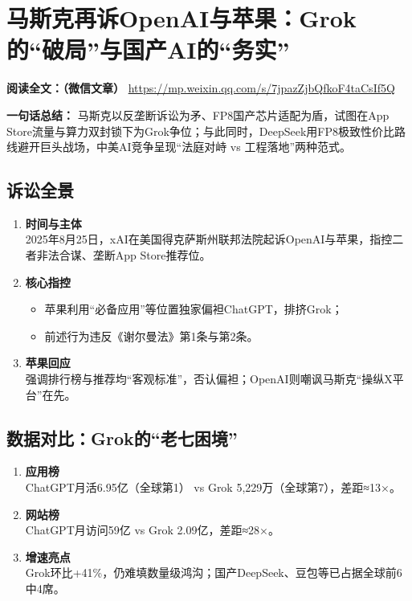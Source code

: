 \clearpage

\section{马斯克再诉OpenAI与苹果：Grok的“破局”与国产AI的“务实”}
\vspace{1cm}
\noindent\textbf{阅读全文：（微信文章）} \url{https://mp.weixin.qq.com/s/7jpazZjbQfkoF4taCsIf5Q}

\textbf{一句话总结：}  
马斯克以反垄断诉讼为矛、FP8国产芯片适配为盾，试图在App Store流量与算力双封锁下为Grok争位；与此同时，DeepSeek用FP8极致性价比路线避开巨头战场，中美AI竞争呈现“法庭对峙 vs 工程落地”两种范式。

\subsection{诉讼全景}
\begin{enumerate}[leftmargin=*, nosep]
    \item \textbf{时间与主体}  \\
    2025年8月25日，xAI在美国得克萨斯州联邦法院起诉OpenAI与苹果，指控二者非法合谋、垄断App Store推荐位。
    \item \textbf{核心指控}  
    \begin{itemize}[nosep]
        \item 苹果利用“必备应用”等位置独家偏袒ChatGPT，排挤Grok；  
        \item 前述行为违反《谢尔曼法》第1条与第2条。
    \end{itemize}
    \item \textbf{苹果回应}  \\
    强调排行榜与推荐均“客观标准”，否认偏袒；OpenAI则嘲讽马斯克“操纵X平台”在先。
\end{enumerate}

\subsection{数据对比：Grok的“老七困境”}
\begin{enumerate}[leftmargin=*, nosep]
    \item \textbf{应用榜}  \\
    ChatGPT月活6.95亿（全球第1） vs Grok 5,229万（全球第7），差距≈13×。
    \item \textbf{网站榜}  \\
    ChatGPT月访问59亿 vs Grok 2.09亿，差距≈28×。
    \item \textbf{增速亮点}  \\
    Grok环比+41\%，仍难填数量级鸿沟；国产DeepSeek、豆包等已占据全球前6中4席。
\end{enumerate}

